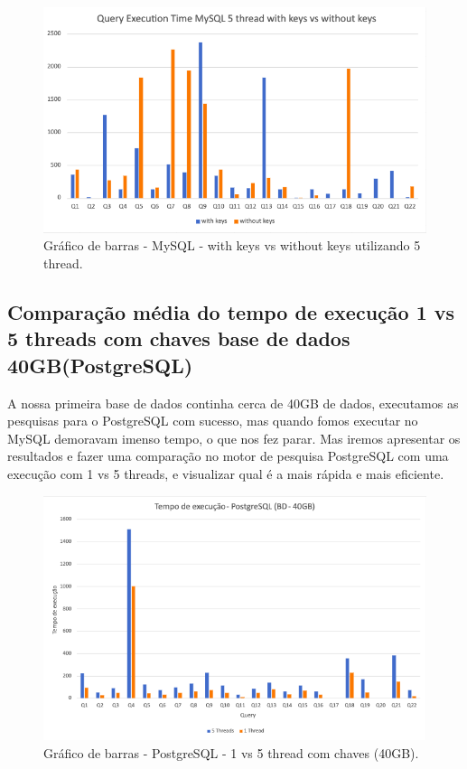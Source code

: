 \documentclass{article}
\begin{document}
\begin{figure}[H]
  \centering
  \includegraphics[width=\textwidth]{Graphs/mysql5threads_withkeys_withoutkeys.png}
  \caption{Gráfico de barras - MySQL - with keys vs without keys utilizando 5 thread.} 
  \label{fig:PKCreation2}
\end{figure}

\clearpage
\subsection{Comparação média do tempo de execução 1 vs 5 threads com chaves base de dados 40GB(PostgreSQL)}

A nossa primeira base de dados continha cerca de 40GB de dados, executamos as pesquisas para o PostgreSQL com sucesso, mas quando fomos executar no MySQL demoravam imenso tempo, o que nos fez parar. Mas iremos apresentar os resultados e fazer uma comparação no motor de pesquisa PostgreSQL com uma execução com 1 vs 5 threads, e visualizar qual é a mais rápida e mais eficiente.

\begin{figure}[H]
  \centering
  \includegraphics[width=\textwidth]{Graphs/postgresql40gb.png}
  \caption{Gráfico de barras - PostgreSQL - 1 vs 5 thread com chaves (40GB).} 
  \label{fig:PKCreation2}
\end{figure}
\end{document}
